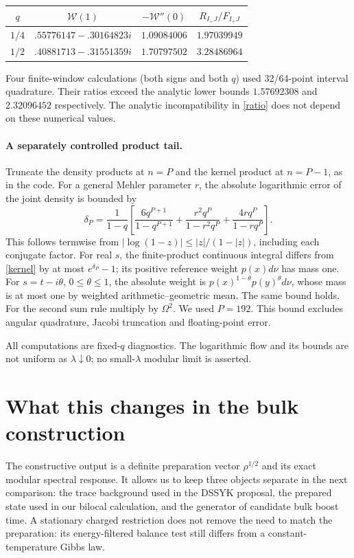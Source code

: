 \documentclass[11pt]{article}
\begin{document}
\begin{center}
\begin{tabular}{cccc}
\toprule
$q$&$\mathcal W(1)$&$-\mathcal W''(0)$&$R_{I_+J}/F_{I_+J}$\\
\midrule
$1/4$&$.55776147-.30164823i$&$1.09084006$&$1.97039949$\\
$1/2$&$.40881713-.31551359i$&$1.70797502$&$3.28486964$\\
\bottomrule
\end{tabular}
\end{center}
Four finite-window calculations (both signs and both $q$) used
32/64-point interval quadrature. Their ratios exceed the analytic
lower bounds $1.57692308$ and $2.32096452$ respectively. The
analytic incompatibility in \eqref{ratio} does not depend on
these numerical values.

\paragraph{A separately controlled product tail.}
Truncate the density products at $n=P$ and the kernel product
at $n=P-1$, as in the code. For a general Mehler parameter $r$,
the absolute logarithmic error of the joint density is bounded by
\begin{equation}\label{producttail}
 \delta_P=\frac1{1-q}\left[
 \frac{6q^{P+1}}{1-q^{P+1}}+
 \frac{r^2q^P}{1-r^2q^P}+
 \frac{4rq^P}{1-rq^P}\right].
\end{equation}
This follows termwise from
$|\log(1-z)|\le |z|/(1-|z|)$, including each conjugate factor.
For real $s$, the finite-product continuous integral differs
from \eqref{kernel} by at most $e^{\delta_P}-1$; its positive
reference weight $p(x)d\nu$ has mass one. For
$s=t-i\theta$, $0\le\theta\le1$, the absolute weight is
$p(x)^{1-\theta}p(y)^\theta d\nu$, whose mass is at most one
by weighted arithmetic--geometric mean. The same bound holds.
For the second sum rule multiply by $\Omega^2$.
We used $P=192$. This bound excludes angular quadrature,
Jacobi truncation and floating-point error.

All computations are fixed-$q$ diagnostics. The logarithmic
flow and its bounds are not uniform as $\lambda\downarrow0$;
no small-$\lambda$ modular limit is asserted.

\newpage
\section{What this changes in the bulk construction}
The constructive output is a definite preparation vector
$\rho^{1/2}$ and its exact modular spectral response. It allows
us to keep three objects separate in the next comparison:
the trace background used in the DSSYK proposal, the prepared
state used in our bilocal calculation, and the generator of
candidate bulk boost time. A stationary charged restriction does
not remove the need to match the preparation: its energy-filtered
balance test still differs from a constant-temperature Gibbs law.
\end{document}
